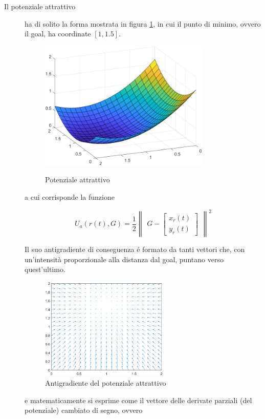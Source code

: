 \documentclass[14pt,a4paper]{extarticle}
\begin{document}
\begin{description}
\item[Il potenziale attrattivo] ha di solito la forma mostrata in figura \ref{potA}, in cui il punto di minimo, ovvero il goal, ha coordinate \([1,1.5]\).
\begin{figure}[H]
\centering
\caption{Potenziale attrattivo}
\includegraphics[width=0.8\textwidth]{potA.png}
\label{potA}
\end{figure}

a cui corrisponde la funzione 

\begin{equation}
U_a(r(t),G) = \frac{1}{2} \begin{Vmatrix}G - \begin{bmatrix} x_r(t)\\ y_r(t) \end{bmatrix}\end{Vmatrix}^2
\end{equation}

Il suo antigradiente di conseguenza é formato da tanti vettori che, con un'intensità proporzionale alla distanza dal goal, puntano verso quest'ultimo.
\begin{figure}[H]
\centering
\caption{Antigradiente del potenziale attrattivo}
\label{antigradA}
\includegraphics[width=0.6\textwidth]{antigradA.png}
\end{figure} e matematicamente si esprime come il vettore delle derivate parziali (del potenziale) cambiato di segno, ovvero 


\end{description}
\end{document}
